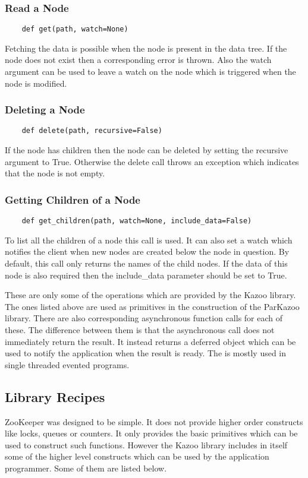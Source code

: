   \subsubsection{Read a Node}
  \begin{lstlisting}
    def get(path, watch=None)
  \end{lstlisting}
  Fetching the data is possible when the node is present in the data tree. If the node does not exist then a corresponding error is thrown. Also the watch argument can be used to leave a watch on the node which is triggered when the node is modified.
  \subsubsection{Deleting a Node}
  \begin{lstlisting}
    def delete(path, recursive=False)
  \end{lstlisting}
  If the node has children then the node can be deleted by setting the recursive argument to True. Otherwise the delete call throws an exception which indicates that the node is not empty.
  
  \subsubsection{Getting Children of a Node}
  \begin{lstlisting}
    def get_children(path, watch=None, include_data=False)
  \end{lstlisting}
  To list all the children of a node this call is used. It can also set a watch which notifies the client when new nodes are created below the node in question. By default, this call only returns the names of the child nodes. If the data of this node is also required then the include\_data parameter should be set to True.
  
  These are only some of the operations which are provided by the Kazoo library. The ones listed above are used as primitives in the construction of the ParKazoo library. There are also corresponding asynchronous function calls for each of these. The difference between them is that the asynchronous call does not immediately return the result. It instead returns a deferred object which can be used to notify the application when the result is ready. The is mostly used in single threaded evented programs.
  
\subsection{Library Recipes}
  ZooKeeper was designed to be simple. It does not provide higher order constructs like locks, queues or counters. It only provides the basic primitives which can be used to construct such functions. However the Kazoo library includes in itself some of the higher level constructs which can be used by the application programmer. Some of them are listed below.
